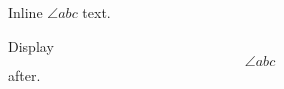 \documentclass[12pt]{article}
\begin{document}
Inline $\angle abc$ text.

Display \[ \angle abc \] after.
\end{document}
